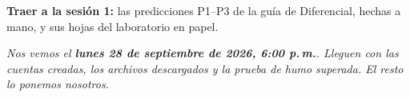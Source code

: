 \documentclass[12pt,letterpaper]{article}
\newcommand{\FECHA}{\textbf{lunes 28 de septiembre de 2026, 6:00 p.\,m.}}
\begin{document}
\textbf{Traer a la sesión 1:} las predicciones P1--P3 de la guía de Diferencial, hechas a mano, y sus hojas del laboratorio en papel.

\vspace{1em}
\begin{center}
\emph{Nos vemos el \FECHA. Lleguen con las cuentas creadas, los archivos descargados y la prueba de humo superada. El resto lo ponemos nosotros.}
\end{center}
\end{document}
